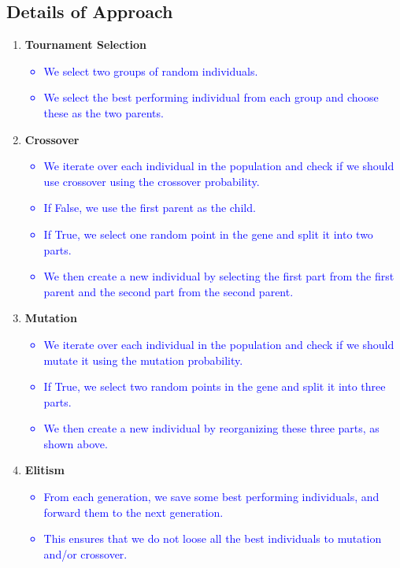 \documentclass[a4paper, 12pt]{article}
\begin{document}
\subsection{Details of Approach}
\begin{enumerate}
	
	\item \textbf{Tournament Selection}
	
	\textcolor{blue}{
	\begin{itemize}
		\item We select two groups of random individuals.
		\item We select the best performing individual from each group and choose these as the two parents.
	\end{itemize}
	}
	
	\item \textbf{Crossover}
	
	\textcolor{blue}{
	\begin{itemize}
		\item We iterate over each individual in the population and check if we should use crossover using the crossover probability.
		\item If False, we use the first parent as the child.
		\item If True, we select one random point in the gene and split it into two parts.
		\item We then create a new individual by selecting the first part from the first parent and the second part from the second parent.
	\end{itemize}
	}
	
	
	\item \textbf{Mutation}
	
	\textcolor{blue}{
	\begin{itemize}
		\item We iterate over each individual in the population and check if we should mutate it using the mutation probability.
		\item If True, we select two random points in the gene and split it into three parts.
		\item We then create a new individual by reorganizing these three parts, as shown above.
	\end{itemize}	
	}
	
	\item \textbf{Elitism}
		
	\textcolor{blue}{
	\begin{itemize}
		\item From each generation, we save some best performing individuals, and forward them to the next generation. 
		\item This ensures that we do not loose all the best individuals to mutation and/or crossover. 
	\end{itemize}
	}
	
	\end{enumerate}
\end{document}
